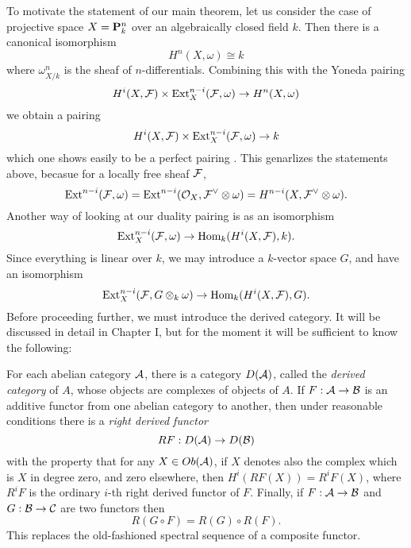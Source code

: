 To motivate the statement of our main theorem, let us consider the case of projective space $X=\mathbf{P}^n_k$ over an algebraically closed field $k$. Then there is a canonical isomorphism
\[H^n(X,\omega)\cong k\]
where $\omega^n_{X/k}$ is the sheaf of $n$-differentials. Combining this with the Yoneda pairing
\[H^i(X,\mathcal{F})\times \mathrm{Ext}_X^{n-i}(\mathcal{F},\omega)\rightarrow H^n(X,\omega)\]
we obtain a pairing
\[H^i(X,\mathcal{F})\times \mathrm{Ext}^{n-i}_X(\mathcal{F},\omega)\rightarrow k\]
which one shows easily to be a perfect pairing \cite{}. This genarlizes the statements above, becasue for a locally free sheaf $\mathcal{F}$,
\[\mathrm{Ext}^{n-i}(\mathcal{F},\omega)=\mathrm{Ext}^{n-i}(\mathcal{O}_X,\mathcal{F}^{\vee}\otimes \omega)=H^{n-i}(X,\mathcal{F}^{\vee}\otimes \omega).\]
Another way of looking at our duality pairing is as an isomorphism
\begin{equation}\label{iso1}\mathrm{Ext}^{n-i}_X (\mathcal{F},\omega)\rightarrow \mathrm{Hom}_k(H^i(X,\mathcal{F}),k).
\end{equation}
Since everything is linear over $k$, we may introduce a $k$-vector space $G$, and have an isomorphism
\begin{equation}\label{iso}\mathrm{Ext}^{n-i}_X (\mathcal{F},G\otimes_k\omega)\rightarrow \mathrm{Hom}_k(H^i(X,\mathcal{F}),G).
\end{equation}
Before proceeding further, we must introduce the derived category. It will be discussed in detail in Chapter I, but for the moment it will be sufficient to know the following:

For each abelian category $\mathcal{A}$, there is a category $D(\mathcal{A})$, called the {\it derived category} of $A$, whose objects are complexes of objects of $A$. If $F:\mathcal{A}\rightarrow \mathcal{B}$ is an additive functor from one abelian category to another, then under reasonable conditions there is a {\it right derived functor} \[RF:D(\mathcal{A})\rightarrow D(\mathcal{B})\] 
with the property that for any $X\in Ob(\mathcal{A})$, if $X$ denotes also the complex which is $X$ in degree zero, and zero elsewhere, then $H^i(RF(X))=R^iF(X)$, where $R^iF$ is the ordinary $i$-th right derived functor of $F$. Finally, if $F:\mathcal{A}\to \mathcal{B}$ and $G:\mathcal{B}\to \mathcal{C}$ are two functors then 
\[R(G\circ F)=R(G)\circ R(F).\]
This replaces the old-fashioned spectral sequence of a composite functor.

